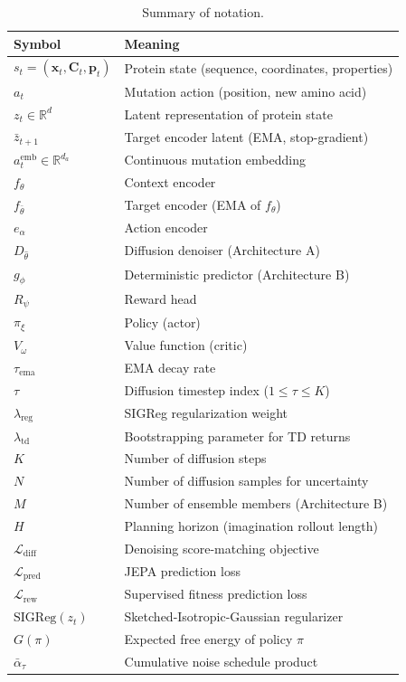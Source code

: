 \documentclass[12pt, a4paper]{article}
\begin{document}
\begin{table}[h]
\centering
\caption{Summary of notation.}
\label{tab:notation}
\small
\begin{tabular}{ll}
\toprule
\textbf{Symbol} & \textbf{Meaning} \\
\midrule
$s_t = (\mathbf{x}_t, \mathbf{C}_t, \mathbf{p}_t)$ & Protein state (sequence, coordinates, properties) \\
$a_t$ & Mutation action (position, new amino acid) \\
$z_t \in \mathbb{R}^d$ & Latent representation of protein state \\
$\bar{z}_{t+1}$ & Target encoder latent (EMA, stop-gradient) \\
$a_t^\text{emb} \in \mathbb{R}^{d_a}$ & Continuous mutation embedding \\
$f_\theta$ & Context encoder \\
$f_{\bar{\theta}}$ & Target encoder (EMA of $f_\theta$) \\
$e_\alpha$ & Action encoder \\
$D_{\hat{\theta}}$ & Diffusion denoiser (Architecture A) \\
$g_\phi$ & Deterministic predictor (Architecture B) \\
$R_\psi$ & Reward head \\
$\pi_\xi$ & Policy (actor) \\
$V_\omega$ & Value function (critic) \\
$\tau_\text{ema}$ & EMA decay rate \\
$\tau$ & Diffusion timestep index ($1 \leq \tau \leq K$) \\
$\lambda_\text{reg}$ & SIGReg regularization weight \\
$\lambda_\text{td}$ & Bootstrapping parameter for TD returns \\
$K$ & Number of diffusion steps \\
$N$ & Number of diffusion samples for uncertainty \\
$M$ & Number of ensemble members (Architecture B) \\
$H$ & Planning horizon (imagination rollout length) \\
$\mathcal{L}_\text{diff}$ & Denoising score-matching objective \\
$\mathcal{L}_\text{pred}$ & JEPA prediction loss \\
$\mathcal{L}_\text{rew}$ & Supervised fitness prediction loss \\
$\text{SIGReg}(z_t)$ & Sketched-Isotropic-Gaussian regularizer \\
$G(\pi)$ & Expected free energy of policy $\pi$ \\
$\bar{\alpha}_\tau$ & Cumulative noise schedule product \\
\bottomrule
\end{tabular}
\end{table}
\end{document}

